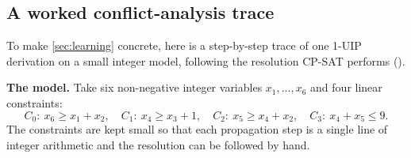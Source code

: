\subsection{A worked conflict-analysis trace}\label{sec:trace}

To make \cref{sec:learning} concrete, here is a step-by-step trace of one
1-UIP derivation on a small integer model, following the resolution CP-SAT
performs ().

\textbf{The model.} Take six non-negative integer variables $x_1, \dots, x_6$ and
four linear constraints:
\[
  C_0:\ x_6 \ge x_1 + x_2, \quad
  C_1:\ x_4 \ge x_3 + 1, \quad
  C_2:\ x_5 \ge x_4 + x_2, \quad
  C_3:\ x_4 + x_5 \le 9 .
\]
The constraints are kept small so that each propagation step is a single line of
integer arithmetic and the resolution can be followed by hand.

